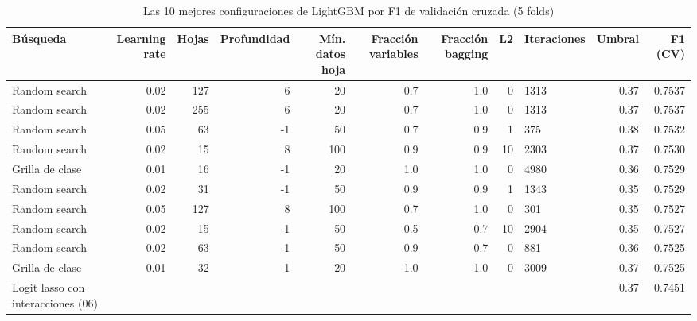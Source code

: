 \begin{table}

\caption{\label{tab:boosting_grid}Las 10 mejores configuraciones de LightGBM por F1 de validación cruzada (5 folds)}
\centering
\begin{tabular}[t]{lrrrrrrrlrr}
\toprule
Búsqueda & Learning rate & Hojas & Profundidad & Mín. datos hoja & Fracción variables & Fracción bagging & L2 & Iteraciones & Umbral & F1 (CV)\\
\midrule
Random search & 0.02 & 127 & 6 & 20 & 0.7 & 1.0 & 0 & 1313 & 0.37 & 0.7537\\
Random search & 0.02 & 255 & 6 & 20 & 0.7 & 1.0 & 0 & 1313 & 0.37 & 0.7537\\
Random search & 0.05 & 63 & -1 & 50 & 0.7 & 0.9 & 1 & 375 & 0.38 & 0.7532\\
Random search & 0.02 & 15 & 8 & 100 & 0.9 & 0.9 & 10 & 2303 & 0.37 & 0.7530\\
Grilla de clase & 0.01 & 16 & -1 & 20 & 1.0 & 1.0 & 0 & 4980 & 0.36 & 0.7529\\
\addlinespace
Random search & 0.02 & 31 & -1 & 50 & 0.9 & 0.9 & 1 & 1343 & 0.35 & 0.7529\\
Random search & 0.05 & 127 & 8 & 100 & 0.7 & 1.0 & 0 & 301 & 0.35 & 0.7527\\
Random search & 0.02 & 15 & -1 & 50 & 0.5 & 0.7 & 10 & 2904 & 0.35 & 0.7527\\
Random search & 0.02 & 63 & -1 & 50 & 0.9 & 0.7 & 0 & 881 & 0.36 & 0.7525\\
Grilla de clase & 0.01 & 32 & -1 & 20 & 1.0 & 1.0 & 0 & 3009 & 0.37 & 0.7525\\
\addlinespace
Logit lasso con interacciones (06) &  &  &  &  &  &  &  &  & 0.37 & 0.7451\\
\bottomrule
\end{tabular}
\end{table}
